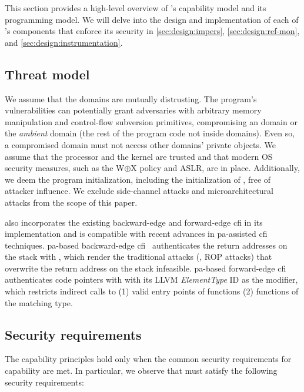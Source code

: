 This section provides a high-level overview of \thename's capability model and its programming model. We will delve into the design and implementation of each of \thename's components that enforce its security in \cref{sec:design:impers}, \cref{sec:design:ref-mon}, and \cref{sec:design:instrumentation}.


\subsection{Threat model}
\label{sec:design:threat-model}

We assume that the domains are mutually distrusting.
The program's vulnerabilities can potentially grant adversaries with arbitrary memory manipulation and control-flow subversion primitives, compromising an \thename domain or the \emph{ambient} domain (the rest of the program code not inside \thename domains).
Even so, a compromised domain must not access other domains' private objects.
We assume that the processor and the kernel are trusted and that modern OS security measures, such as the W{$\oplus$}X policy and ASLR, are in place.
Additionally, we deem the program initialization, including the initialization of \thename, free of attacker influence.
We exclude side-channel attacks and microarchitectural attacks from the scope of this paper.

\thename also incorporates the existing backward-edge and forward-edge \gls{cfi} in its implementation and is compatible with recent advances in \gls{pa}-assisted \gls{cfi} techniques.
\gls{pa}-based backward-edge \gls{cfi}~\cite{pac-it-up,qualcomm-pac,pacstack,llvm-ret-addr} authenticates the return addresses on the stack with , which render the traditional attacks (\eg, ROP attacks) that overwrite the return address on the stack infeasible.
\gls{pa}-based forward-edge \gls{cfi}~\cite{kernel-pac,pac-it-up} authenticates code pointers with  with its LLVM \emph{ElementType} ID as the modifier, which restricts indirect calls to (1) valid entry points of functions (2) functions of the matching type.


\subsection{Security requirements}
\label{sec:overview:secreq}
The capability principles hold only when the common security requirements for capability are met.
In particular, we observe that \thename must satisfy the following security requirements:

